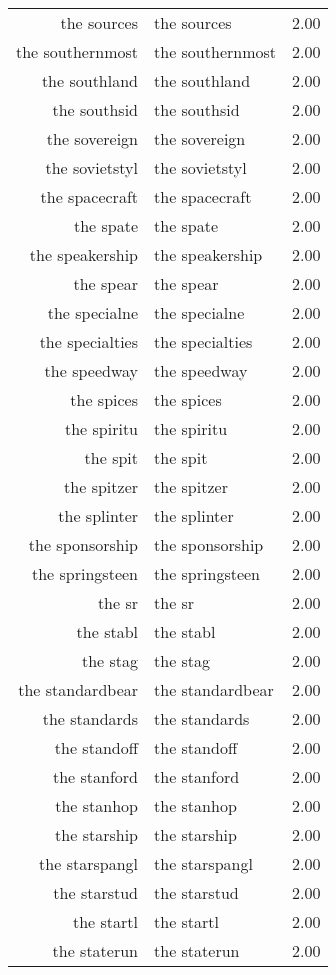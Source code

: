 \begin{table}[ht]
\begin{tabular}{rlr}
  the sources & the sources & 2.00 \\ 
  the southernmost & the southernmost & 2.00 \\ 
  the southland & the southland & 2.00 \\ 
  the southsid & the southsid & 2.00 \\ 
  the sovereign & the sovereign & 2.00 \\ 
  the sovietstyl & the sovietstyl & 2.00 \\ 
  the spacecraft & the spacecraft & 2.00 \\ 
  the spate & the spate & 2.00 \\ 
  the speakership & the speakership & 2.00 \\ 
  the spear & the spear & 2.00 \\ 
  the specialne & the specialne & 2.00 \\ 
  the specialties & the specialties & 2.00 \\ 
  the speedway & the speedway & 2.00 \\ 
  the spices & the spices & 2.00 \\ 
  the spiritu & the spiritu & 2.00 \\ 
  the spit & the spit & 2.00 \\ 
  the spitzer & the spitzer & 2.00 \\ 
  the splinter & the splinter & 2.00 \\ 
  the sponsorship & the sponsorship & 2.00 \\ 
  the springsteen & the springsteen & 2.00 \\ 
  the sr & the sr & 2.00 \\ 
  the stabl & the stabl & 2.00 \\ 
  the stag & the stag & 2.00 \\ 
  the standardbear & the standardbear & 2.00 \\ 
  the standards & the standards & 2.00 \\ 
  the standoff & the standoff & 2.00 \\ 
  the stanford & the stanford & 2.00 \\ 
  the stanhop & the stanhop & 2.00 \\ 
  the starship & the starship & 2.00 \\ 
  the starspangl & the starspangl & 2.00 \\ 
  the starstud & the starstud & 2.00 \\ 
  the startl & the startl & 2.00 \\ 
  the staterun & the staterun & 2.00 \\ 

\end{tabular}
\end{table}
